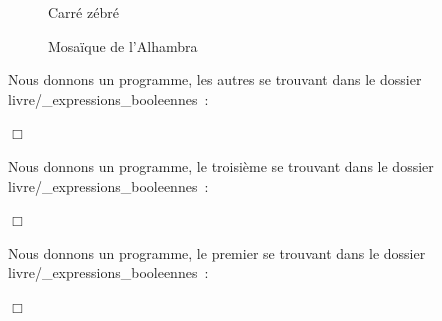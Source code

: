 \begin{figure}[htbp]
 \caption{Carré zébré}\label{fig:carzeb}
\end{figure}
\begin{figure}[htbp]
 \caption{Mosaïque de l'Alhambra}\label{fig:mosaic6}
\end{figure}
\begin{corrige}{
Nous donnons un programme, les autres se trouvant dans le dossier
{\idt livre/\_expressions\_booleennes}~:

\noindent $\Box$}\end{corrige}
\begin{corrige}{
Nous donnons un programme, le troisième se trouvant dans le dossier
{\idt livre/\_expressions\_booleennes}~:

\noindent $\Box$}\end{corrige}
\begin{corrige}{
Nous donnons un programme, le premier se trouvant dans le dossier
{\idt livre/\_expressions\_booleennes}~:

\noindent $\Box$}\end{corrige}

